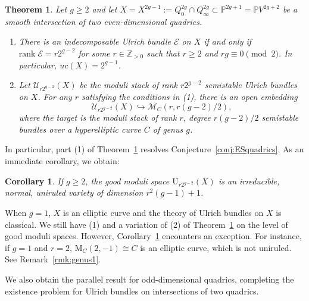 \documentclass[12pt, letterpaper]{amsart}
\newtheorem{theoremletter}{Theorem}
\newtheorem{corollary}[theorem]{Corollary}
\theoremstyle{definition}
\newcommand{\PP}{\mathbb{P} }
\newcommand{\ZZ}{\mathbb{Z} }
\newcommand{\cE}{\mathcal{E} }
\newcommand{\cM}{\mathcal{M} }
\newcommand{\cU}{\mathcal{U} }
\newcommand{\rM}{\mathrm{M} }
\newcommand{\rU}{\mathrm{U} }
\def\rank{\mathrm{rank}\;}
\begin{document}
\begin{theoremletter}\label{thm:mainthmeven}
Let \(g \ge 2\) and let \(X = X^{2g-1} := Q_{0}^{2g} \cap Q_{\infty}^{2g} \subset \PP^{2g+1} = \PP V^{2g+2}\) be a smooth intersection of two even-dimensional quadrics.
\begin{enumerate}
  \item There is an indecomposable Ulrich bundle \(\cE\) on \(X\) if and only if \(\rank \cE = r2^{g-2}\) for some \(r \in \ZZ_{> 0}\) such that \(r \ge 2\) and \(rg \equiv 0 \pmod 2\). In particular, \(uc(X) = 2^{g-1}\).
  \item Let \(\cU_{r2^{g-2}}(X)\) be the moduli stack of rank \(r2^{g-2}\) semistable Ulrich bundles on \(X\). For any \(r\) satisfying the conditions in (1), there is an open embedding
  \[\cU_{r2^{g-2}}(X) \hookrightarrow \cM_C(r, r(g-2)/2),\]
  where the target is the moduli stack of rank \(r\), degree \(r(g-2)/2\) semistable bundles over a hyperelliptic curve \(C\) of genus \(g\).
\end{enumerate}
\end{theoremletter}

In particular, part (1) of Theorem~\ref{thm:mainthmeven} resolves Conjecture~\ref{conj:ESquadrics}. As an immediate corollary, we obtain:

\begin{corollary}\label{cor:evenintersection}
If \(g \ge 2\), the good moduli space \(\rU_{r2^{g-2}}(X)\) is an irreducible, normal, uniruled variety of dimension \(r^2(g-1)+1\).
\end{corollary}

When \(g = 1\), \(X\) is an elliptic curve and the theory of Ulrich bundles on \(X\) is classical. We still have (1) and a variation of (2) of Theorem~\ref{thm:mainthmeven} on the level of good moduli spaces. However, Corollary~\ref{cor:evenintersection} encounters an exception. For instance, if \(g = 1\) and \(r = 2\), \(\rM_C(2, -1) \cong C\) is an elliptic curve, which is not uniruled. See Remark~\ref{rmk:genus1}.

We also obtain the parallel result for odd-dimensional quadrics, completing the existence problem for Ulrich bundles on intersections of two quadrics.
\end{document}
